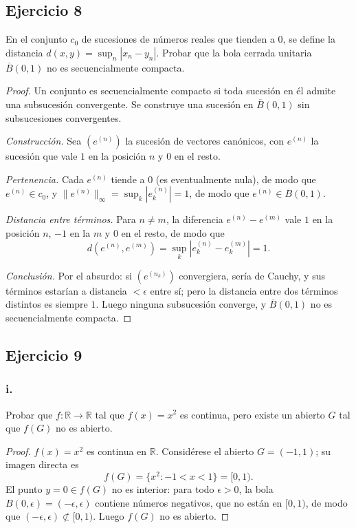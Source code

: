 \documentclass[11pt, a4paper]{article}
\begin{document}
\subsection*{Ejercicio 8}

En el conjunto $c_0$ de sucesiones de números reales que tienden a 0, se define la distancia
$d(x, y) = \sup_n |x_n - y_n|$.
Probar que la bola cerrada unitaria $\overline{B}(0, 1)$ no es secuencialmente compacta.

\begin{proof}
Un conjunto es secuencialmente compacto si toda sucesión en él admite una subsucesión convergente.
Se construye una sucesión en $\overline{B}(0, 1)$ sin subsucesiones convergentes.

\textit{Construcción.} Sea $(e^{(n)})$ la sucesión de vectores canónicos, con $e^{(n)}$ la sucesión
que vale $1$ en la posición $n$ y $0$ en el resto.

\textit{Pertenencia.} Cada $e^{(n)}$ tiende a $0$ (es eventualmente nula), de modo que $e^{(n)} \in c_0$,
y $\|e^{(n)}\|_\infty = \sup_k |e^{(n)}_k| = 1$, de modo que $e^{(n)} \in \overline{B}(0, 1)$.

\textit{Distancia entre términos.} Para $n \neq m$, la diferencia $e^{(n)} - e^{(m)}$ vale $1$ en la
posición $n$, $-1$ en la $m$ y $0$ en el resto, de modo que
$$ d(e^{(n)}, e^{(m)}) = \sup_k |e^{(n)}_k - e^{(m)}_k| = 1. $$

\textit{Conclusión.} Por el absurdo: si $(e^{(n_k)})$ convergiera, sería de Cauchy, y sus términos estarían a
distancia $< \epsilon$ entre sí; pero la distancia entre dos términos distintos es siempre $1$. Luego
ninguna subsucesión converge, y $\overline{B}(0, 1)$ no es secuencialmente compacta.
\end{proof}

\subsection*{Ejercicio 9}

\subsubsection*{i.}
Probar que $f: \mathbb{R} \to \mathbb{R}$ tal que $f(x) = x^2$ es continua, pero existe un abierto
$G$ tal que $f(G)$ no es abierto.

\begin{proof}
$f(x) = x^2$ es continua en $\mathbb{R}$. Considérese el abierto $G = (-1, 1)$; su imagen directa es
$$ f(G) = \{ x^2 : -1 < x < 1 \} = [0, 1). $$
El punto $y = 0 \in f(G)$ no es interior: para todo $\epsilon > 0$, la bola
$B(0, \epsilon) = (-\epsilon, \epsilon)$ contiene números negativos, que no están en $[0, 1)$, de modo
que $(-\epsilon, \epsilon) \not\subset [0, 1)$. Luego $f(G)$ no es abierto.
\end{proof}
\end{document}
